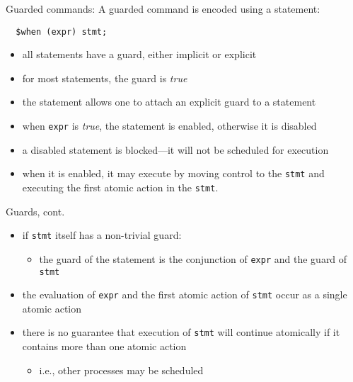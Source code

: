 \documentclass[t]{beamer}
\begin{document}
\begin{frame}[containsverbatim]{Guarded commands: \cwhen}
  A guarded command is encoded using a \cwhen{} statement:
\begin{verbatim}
  $when (expr) stmt;
\end{verbatim}
  \begin{itemize}
  \item all statements have a guard, either implicit or explicit
  \item for most statements, the guard is \emph{true}
  \item the \cwhen{} statement allows one to attach an explicit guard
    to a statement
  \item when \texttt{expr} is \emph{true}, the statement is
    \alert{enabled}, otherwise it is \alert{disabled}
  \item a disabled statement is \alert{blocked}---it will not
    be scheduled for execution
  \item when it is enabled, it may execute by
    moving control to the \texttt{stmt} and executing the first atomic
    action in the \texttt{stmt}.
  \end{itemize}
\end{frame}

\begin{frame}{Guards, cont.}
  \begin{itemize}
  \item if \texttt{stmt} itself has a non-trivial guard:
    \begin{itemize}
    \item the guard of the \cwhen{} statement is the conjunction of
      \texttt{expr} and the guard of \texttt{stmt}
    \end{itemize}
  \item the evaluation of \texttt{expr} and the first atomic action of
    \texttt{stmt} occur as a single atomic action
  \item  there is no guarantee that execution of \texttt{stmt}
    will continue atomically if it contains more than one atomic
    action
    \begin{itemize}
    \item i.e., other processes may be scheduled
    \end{itemize}
  \end{itemize}
\end{frame}
\end{document}
